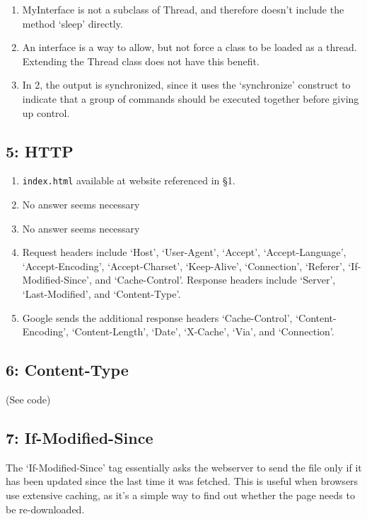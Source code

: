 \documentclass[10pt,letterpaper,titlepage]{article}
\begin{document}
\begin{enumerate}
  \item MyInterface is not a subclass of Thread, and therefore doesn't include the method `sleep' directly. 

  \item An interface is a way to allow, but not force a class to be loaded as a thread. Extending the Thread class does not have this benefit.

  \item In 2, the output is synchronized, since it uses the `synchronize' construct to indicate that a group of commands should be executed together before giving up control.

\end{enumerate}

\subsection*{5: HTTP}
\begin{enumerate}
\item \texttt{index.html} available at website referenced in \S 1.
\item No answer seems necessary
\item No answer seems necessary
\item Request headers include `Host', `User-Agent', `Accept', `Accept-Language', `Accept-Encoding', `Accept-Charset', `Keep-Alive', `Connection', `Referer', `If-Modified-Since', and `Cache-Control'. Response headers include `Server', `Last-Modified', and `Content-Type'.
\item Google sends the additional response headers `Cache-Control', `Content-Encoding', `Content-Length', `Date', `X-Cache', `Via', and `Connection'.


\end{enumerate}

\subsection*{6: Content-Type}
(See code)

\subsection*{7: If-Modified-Since}
The `If-Modified-Since' tag essentially asks the webserver to send the file only if it has been updated since the last time it was fetched. This is useful when browsers use extensive caching, as it's a simple way to find out whether the page needs to be re-downloaded.
\end{document}
